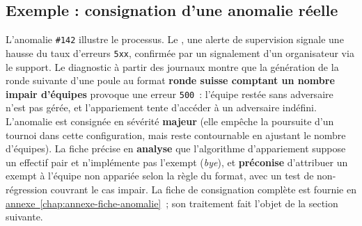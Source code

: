 \subsection{Exemple : consignation d'une anomalie réelle}
L'anomalie \texttt{\#142} illustre le processus. Le \todo{[date]}, une alerte de supervision signale une hausse du taux d'erreurs \texttt{5xx}, confirmée par un signalement d'un organisateur via le support. Le diagnostic à partir des journaux montre que la génération de la ronde suivante d'une poule au format \textbf{ronde suisse comptant un nombre impair d'équipes} provoque une erreur \texttt{500}~: l'équipe restée sans adversaire n'est pas gérée, et l'appariement tente d'accéder à un adversaire indéfini. L'anomalie est consignée en sévérité \textbf{majeur} (elle empêche la poursuite d'un tournoi dans cette configuration, mais reste contournable en ajustant le nombre d'équipes). La fiche précise en \textbf{analyse} que l'algorithme d'appariement suppose un effectif pair et n'implémente pas l'exempt (\emph{bye}), et \textbf{préconise} d'attribuer un exempt à l'équipe non appariée selon la règle du format, avec un test de non-régression couvrant le cas impair. La fiche de consignation complète est fournie en \hyperref[chap:annexe-fiche-anomalie]{annexe~\ref*{chap:annexe-fiche-anomalie}}~; son traitement fait l'objet de la section suivante.

